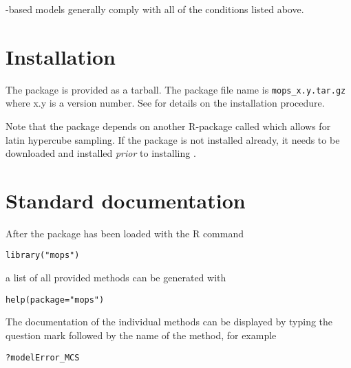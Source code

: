 -based models generally comply with all of the conditions listed above.

\section{Installation} \label{sec:mops:install}

The  package is provided as a tarball. The package file name is \verb!mops_x.y.tar.gz! where x.y is a version number. See \citet{Echse-Install-Doc} for details on the installation procedure.

Note that the  package depends on another R-package called  which allows for latin hypercube sampling. If the  package is not installed already, it needs to be downloaded and installed \emph{prior} to installing .

\section{Standard documentation} \label{sec:mops:docs}

After the  package has been loaded with the R command

\begin{lstlisting}[style=R]
library("mops")
\end{lstlisting}

a list of all provided methods can be generated with

\begin{lstlisting}[style=R]
help(package="mops")
\end{lstlisting}

The documentation of the individual methods can be displayed by typing the question mark followed by the name of the method, for example

\begin{lstlisting}[style=R]
?modelError_MCS
\end{lstlisting}


